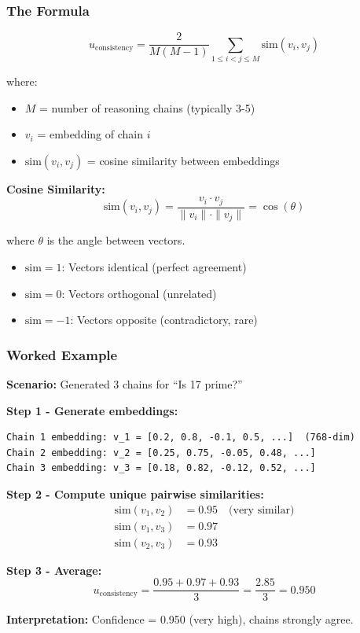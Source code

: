 \documentclass[12pt,a4paper]{article}
\theoremstyle{definition}
\begin{document}
\subsubsection{The Formula}

\begin{equation}
u_{\text{consistency}} = \frac{2}{M(M-1)} \sum_{1 \le i < j \le M} \text{sim}(v_i, v_j)
\end{equation}

where:
\begin{itemize}
    \item $M$ = number of reasoning chains (typically 3-5)
    \item $v_i$ = embedding of chain $i$
    \item $\text{sim}(v_i, v_j)$ = cosine similarity between embeddings
\end{itemize}

\textbf{Cosine Similarity:}
\begin{equation}
\text{sim}(v_i, v_j) = \frac{v_i \cdot v_j}{\|v_i\| \cdot \|v_j\|} = \cos(\theta)
\end{equation}

where $\theta$ is the angle between vectors.

\begin{itemize}
    \item $\text{sim} = 1$: Vectors identical (perfect agreement)
    \item $\text{sim} = 0$: Vectors orthogonal (unrelated)
    \item $\text{sim} = -1$: Vectors opposite (contradictory, rare)
\end{itemize}

\subsubsection{Worked Example}

\begin{examplebox}
\textbf{Scenario:} Generated 3 chains for ``Is 17 prime?''

\textbf{Step 1 - Generate embeddings:}
\begin{verbatim}
Chain 1 embedding: v_1 = [0.2, 0.8, -0.1, 0.5, ...]  (768-dim)
Chain 2 embedding: v_2 = [0.25, 0.75, -0.05, 0.48, ...]
Chain 3 embedding: v_3 = [0.18, 0.82, -0.12, 0.52, ...]
\end{verbatim}

\textbf{Step 2 - Compute unique pairwise similarities:}
\begin{align}
\text{sim}(v_1, v_2) &= 0.95 \quad \text{(very similar)} \\
\text{sim}(v_1, v_3) &= 0.97 \\
\text{sim}(v_2, v_3) &= 0.93
\end{align}

\textbf{Step 3 - Average:}
\begin{equation}
u_{\text{consistency}} = \frac{0.95 + 0.97 + 0.93}{3} = \frac{2.85}{3} = 0.950
\end{equation}

\textbf{Interpretation:} Confidence = 0.950 (very high), chains strongly agree.
\end{examplebox}
\end{document}
